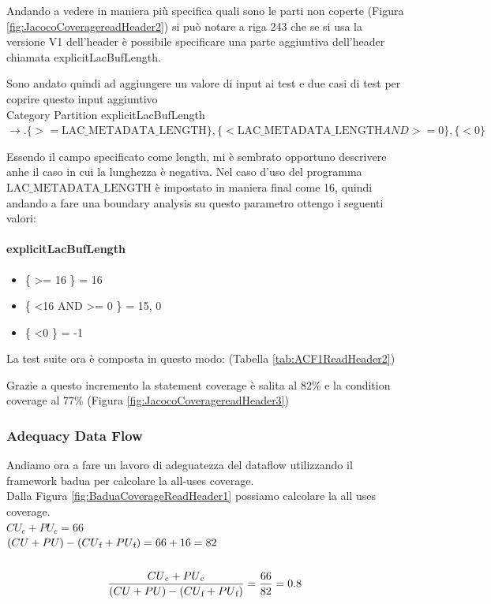 \documentclass[12pt, a4paper]{article}
\begin{document}
Andando a vedere in maniera più specifica quali sono le parti non coperte (Figura \ref{fig:JacocoCoveragereadHeader2})
si può notare a riga 243 che se si usa la versione V1 dell'header è possibile specificare una parte aggiuntiva dell'header
chiamata explicitLacBufLength.

Sono andato quindi ad aggiungere un valore di input ai test e due casi di test per coprire questo input aggiuntivo \\
Category Partition explicitLacBufLength $\rightarrow.
\{ >= \text{LAC\_METADATA\_LENGTH} \},
\{ <  \text{LAC\_METADATA\_LENGTH} AND >= 0\}, 
\{ < 0 \}$ 

Essendo il campo specificato come length, mi è sembrato opportuno descrivere anhe il caso in cui la lunghezza è negativa.
Nel caso d'uso del programma $\text{LAC\_METADATA\_LENGTH}$ è impostato in maniera final come 16, quindi andando a fare una boundary
analysis su questo parametro ottengo i seguenti valori:

\paragraph{explicitLacBufLength}
\begin{itemize}
  \item \{ \textgreater= 16 \} = 16
  \item \{ \textless 16 AND \textgreater= 0 \} = 15, 0
  \item \{ \textless 0 \} = -1
\end{itemize}

La test suite ora è composta in questo modo: (Tabella \ref{tab:ACF1ReadHeader2})

Grazie a questo incremento la statement coverage è salita al 82\%
e la condition coverage al 77\% (Figura \ref{fig:JacocoCoveragereadHeader3})


\subsubsection{Adequacy Data Flow}

Andiamo ora a fare un lavoro di adeguatezza del dataflow utilizzando il framework badua per calcolare la all-uses coverage. \\
Dalla Figura \ref{fig:BaduaCoverageReadHeader1} possiamo calcolare la all uses coverage. \\

\(CU_c + PU_c = 66\) \\
\( (CU + PU) - (CU\textsubscript{f} + PU\textsubscript{f}) = 66 + 16 = 82\) \\ \\
\[\frac{{CU\textsubscript{c} + PU\textsubscript{c}}}{{(CU + PU) - (CU\textsubscript{f} + PU\textsubscript{f})}} = \frac{{66}}{{82}} = 0.8\]
\end{document}

